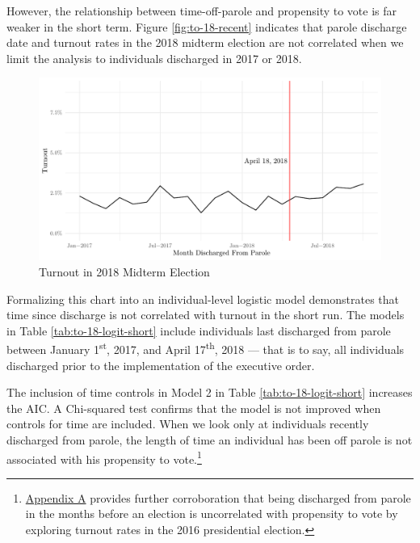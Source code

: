 \documentclass[12pt,]{article}
\let\rmarkdownfootnote\footnote%
\def\footnote{\protect\rmarkdownfootnote}
\begin{document}
However, the relationship between time-off-parole and propensity to vote is far weaker in the short term. Figure \ref{fig:to-18-recent} indicates that parole discharge date and turnout rates in the 2018 midterm election are not correlated when we limit the analysis to individuals discharged in 2017 or 2018.

\begin{figure}[H]

{\centering \includegraphics{felony_disenfranchisement_nys_files/figure-latex/to-18-recent-chart-1} 

}

\caption{\label{fig:to-18-recent}Turnout in 2018 Midterm Election}\label{fig:to-18-recent-chart}
\end{figure}

Formalizing this chart into an individual-level logistic model demonstrates that time since discharge is not correlated with turnout in the short run. The models in Table \ref{tab:to-18-logit-short} include individuals last discharged from parole between January 1\textsuperscript{st}, 2017, and April 17\textsuperscript{th}, 2018 --- that is to say, all individuals discharged prior to the implementation of the executive order.



The inclusion of time controls in Model 2 in Table \ref{tab:to-18-logit-short} increases the AIC. A Chi-squared test confirms that the model is not improved when controls for time are included. When we look only at individuals recently discharged from parole, the length of time an individual has been off parole is not associated with his propensity to vote.\footnote{\protect\hyperlink{appendix-a}{Appendix A} provides further corroboration that being discharged from parole in the months before an election is uncorrelated with propensity to vote by exploring turnout rates in the 2016 presidential election.}
\end{document}
